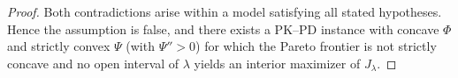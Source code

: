 \begin{proof}
Both contradictions arise within a model satisfying all stated hypotheses. Hence the assumption is false, and there exists a PK--PD instance with concave \(\Phi\) and strictly convex \(\Psi\) (with \(\Psi''>0\)) for which the Pareto frontier is not strictly concave and no open interval of \(\lambda\) yields an interior maximizer of \(J_\lambda\).\qedhere
\end{proof}
